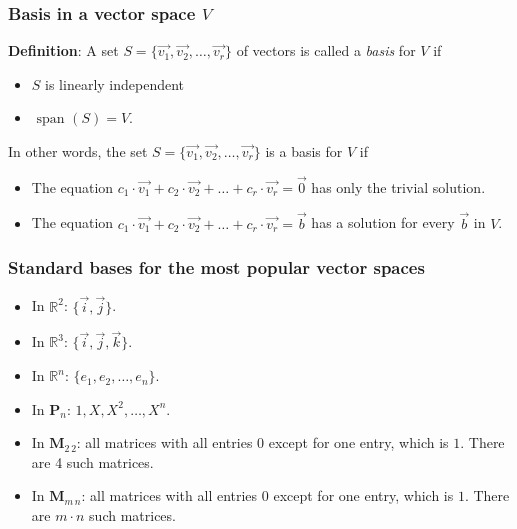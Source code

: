\begin{frame}[fragile]
\frametitle{Basis in a vector space $V$}

\textbf{Definition}: A set $S = \{ \vec{v_1}, \vec{v_2}, \ldots, \vec{v_r} \}$ of vectors is called a {\em basis} for $V$ if
\begin{itemize}
\item $S$ is linearly independent

\item $\text{ span } (S) = V$.
\end{itemize}


\bigskip

In other words, the set $S = \{ \vec{v_1}, \vec{v_2}, \ldots, \vec{v_r} \}$ is a basis for $V$ if
\begin{itemize}
\item The equation $c_1 \cdot \vec{v_1} + c_2 \cdot \vec{v_2} + \ldots + c_r \cdot \vec{v_r} = \vec{0}$ has only the trivial solution.

\item The equation $c_1 \cdot \vec{v_1} + c_2 \cdot \vec{v_2} + \ldots + c_r \cdot \vec{v_r} = \vec{b}$ has a solution for every $\vec{b}$ in $V$.
\end{itemize}


\end{frame}


\begin{frame}[fragile]
\frametitle{Standard bases for the most popular vector spaces}

\begin{itemize}
\item In $\mathbb{R}^2$: $\{ \vec{i}, \vec{j} \}$.

\smallskip

\item In $\mathbb{R}^3$: $\{ \vec{i}, \vec{j}, \vec{k} \}$.

\smallskip

\item In $\mathbb{R}^n$: $\{ e_1, e_2, \ldots, e_n \}$.

\smallskip

\item In $\textbf{P}_n$: $1, X, X^2, \ldots, X^n$.

\smallskip

\item In $\textbf{M}_{2 \, 2}$: all matrices with all entries $0$ except for one entry, which is $1$. There are 4 such matrices.

\smallskip

\item In $\textbf{M}_{m \, n}$: all matrices with all entries $0$ except for one entry, which is $1$. There are $m \cdot n$ such matrices.

\end{itemize}


\end{frame}


